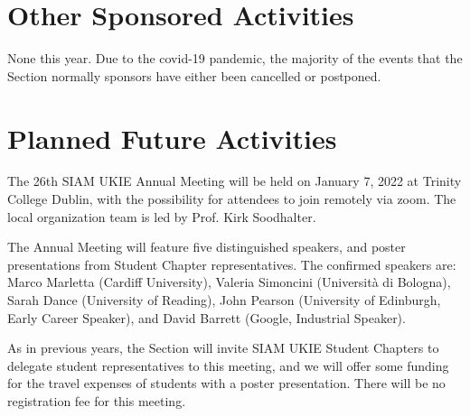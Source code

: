 \documentclass{article}
\begin{document}
\section*{Other Sponsored Activities}
None this year. Due to the covid-19 pandemic, the majority of the events that the Section normally sponsors 
have either been cancelled or postponed. 

\section*{Planned Future Activities}
The 26th SIAM UKIE Annual Meeting will be held on January 7, 2022 at Trinity College Dublin, with the possibility for 
attendees to join remotely via zoom. 
The local organization team is led by Prof. Kirk Soodhalter. 

The Annual Meeting will feature five distinguished speakers, and poster presentations from Student
Chapter representatives. 
The confirmed speakers are:
 Marco Marletta (Cardiff University),
Valeria Simoncini (Universit\`{a} di Bologna),
Sarah Dance (University of Reading), 
 John Pearson (University of Edinburgh, Early Career Speaker), and 
David Barrett (Google, Industrial Speaker). 

As in previous years, the Section will invite SIAM UKIE Student Chapters to delegate student representatives
to this meeting, and we will offer some funding for the travel expenses of students with a poster
presentation. There will be no registration fee for this meeting.
\end{document}
